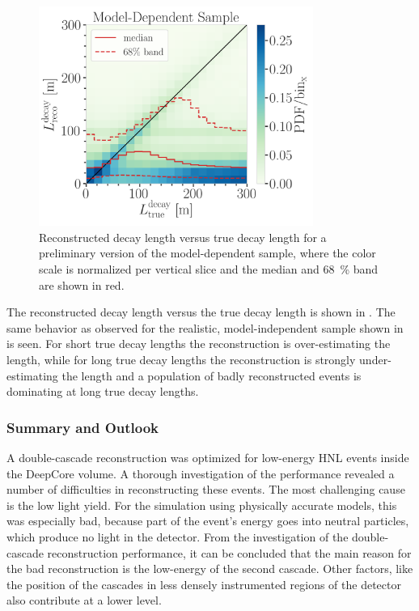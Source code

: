 \begin{figure}[h!]
    \includegraphics[width=0.8\textwidth]{figures/results/190607/resolutions/reco_decayL_vs_true_decayL_final_level_good_step_contours.png}
    \caption[Reconstructed decay length resolution versus true decay length - preliminary model-dependent sample]{Reconstructed decay length versus true decay length for a preliminary version of the model-dependent sample, where the color scale is normalized per vertical slice and the median and \SI{68}{\percent} band are shown in red.}
\end{figure}
The reconstructed decay length versus the true decay length is shown in . The same behavior as observed for the realistic, model-independent sample shown in  is seen. For short true decay lengths the reconstruction is over-estimating the length, while for long true decay lengths the reconstruction is strongly under-estimating the length and a population of badly reconstructed events is dominating at long true decay lengths.


\subsubsection{Summary and Outlook}

A double-cascade reconstruction was optimized for low-energy HNL events inside the DeepCore volume. A thorough investigation of the performance revealed a number of difficulties in reconstructing these events. The most challenging cause is the low light yield. For the simulation using physically accurate models, this was especially bad, because part of the event's energy goes into neutral particles, which produce no light in the detector. From the investigation of the double-cascade reconstruction performance, it can be concluded that the main reason for the bad reconstruction is the low-energy of the second cascade. Other factors, like the position of the cascades in less densely instrumented regions of the detector also contribute at a lower level.

